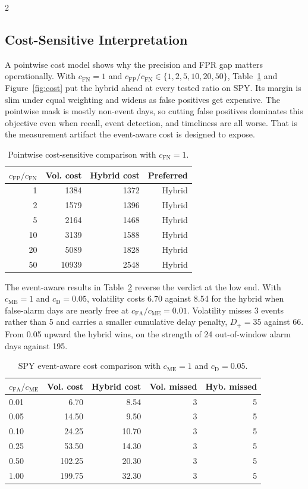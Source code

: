 \documentclass{book}
\begin{document}
\begin{multicols}{2}
\subsection{Cost-Sensitive Interpretation}
\label{sec:cost}
A pointwise cost model shows why the precision and FPR gap matters operationally. With $c_{\mathrm{FN}}=1$ and $c_{\mathrm{FP}}/c_{\mathrm{FN}}\in\{1,2,5,10,20,50\}$, Table~\ref{tab:cost} and Figure~\ref{fig:cost} put the hybrid ahead at every tested ratio on SPY. Its margin is slim under equal weighting and widens as false positives get expensive. The pointwise mask is mostly non-event days, so cutting false positives dominates this objective even when recall, event detection, and timeliness are all worse. That is the measurement artifact the event-aware cost is designed to expose.

\begin{table}[H]
\centering
\caption{Pointwise cost-sensitive comparison with $c_{\mathrm{FN}}=1$.}
\label{tab:cost}
\scriptsize
\begin{tabular}{rrrr}
\toprule
$c_{\mathrm{FP}}/c_{\mathrm{FN}}$ & Vol. cost & Hybrid cost & Preferred\\
\midrule
1 & 1384 & 1372 & Hybrid\\
2 & 1579 & 1396 & Hybrid\\
5 & 2164 & 1468 & Hybrid\\
10 & 3139 & 1588 & Hybrid\\
20 & 5089 & 1828 & Hybrid\\
50 & 10939 & 2548 & Hybrid\\
\bottomrule
\end{tabular}
\end{table}

The event-aware results in Table~\ref{tab:event_cost} reverse the verdict at the low end. With $c_{\mathrm{ME}}=1$ and $c_{\mathrm{D}}=0.05$, volatility costs 6.70 against 8.54 for the hybrid when false-alarm days are nearly free at $c_{\mathrm{FA}}/c_{\mathrm{ME}}=0.01$. Volatility misses 3 events rather than 5 and carries a smaller cumulative delay penalty, $D_+=35$ against 66. From 0.05 upward the hybrid wins, on the strength of 24 out-of-window alarm days against 195.

\begin{table}[H]
\centering
\caption{SPY event-aware cost comparison with $c_{\mathrm{ME}}=1$ and $c_{\mathrm{D}}=0.05$.}
\label{tab:event_cost}
\scriptsize
\begin{tabular}{lrrrr}
\toprule
$c_{\mathrm{FA}}/c_{\mathrm{ME}}$ & Vol. cost & Hybrid cost & Vol. missed & Hyb. missed\\
\midrule
0.01 & 6.70 & 8.54 & 3 & 5\\
0.05 & 14.50 & 9.50 & 3 & 5\\
0.10 & 24.25 & 10.70 & 3 & 5\\
0.25 & 53.50 & 14.30 & 3 & 5\\
0.50 & 102.25 & 20.30 & 3 & 5\\
1.00 & 199.75 & 32.30 & 3 & 5\\
\bottomrule
\end{tabular}
\end{table}


\end{multicols}
\end{document}
